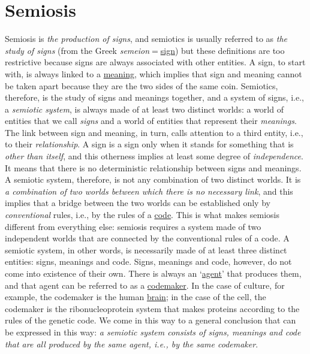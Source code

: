 \documentclass[12pt]{article}
\begin{document}
\section{Semiosis}
Semiosis is \textit{the production of signs}, and semiotics is usually referred to as \textit{the study of signs} (from the Greek \textit{semeion}$=$\hyperlink{signs}{sign}) but these definitions are too restrictive because signs are always associated with other entities. A sign, to start with, is always linked to a \hyperlink{meaning}{meaning}, which implies that sign and meaning cannot be taken apart because they are the two sides of the same coin. Semiotics, therefore, is the study of signs and meanings together, and a system of signs, i.e., a \textit{semiotic system}, is always made of at least two distinct worlds: a world of entities that we call \textit{signs} and a world of entities that represent their \textit{meanings}. The link between sign and meaning, in turn, calls attention to a third entity, i.e., to their \textit{relationship}. A sign is a sign only when it stands for something that is \textit{other than itself}, and this otherness implies at least some degree of \textit{independence}. It means that there is no deterministic relationship between signs and meanings. A semiotic system, therefore, is not any combination of two distinct worlds. It is \textit{a combination of two worlds between which there is no necessary link}, and this implies that a bridge between the two worlds can be established only by \textit{conventional} rules, i.e., by the rules of a \hyperlink{code}{code}. This is what makes semiosis different from everything else: semiosis requires a system made of two independent worlds that are connected by the conventional rules of a code. A semiotic system, in other words, is necessarily made of at least three distinct entities: signs, meanings and code. Signs, meanings and code, however, do not come into existence of their own. There is always an `\hyperlink{agent}{agent}' that produces them, and that agent can be referred to as a \hyperlink{codemakers}{codemaker}. In the case of culture, for example, the codemaker is the human \hyperlink{brain}{brain}; in the case of the cell, the codemaker is the ribonucleoprotein system that makes proteins according to the rules of the genetic code. We come in this way to a general conclusion that can be expressed in this way: \textit{a semiotic system consists of signs, meanings and code that are all produced by the same agent, i.e., by the same codemaker}.


\hypertarget{semiotic_dynamics}{}
\end{document}
